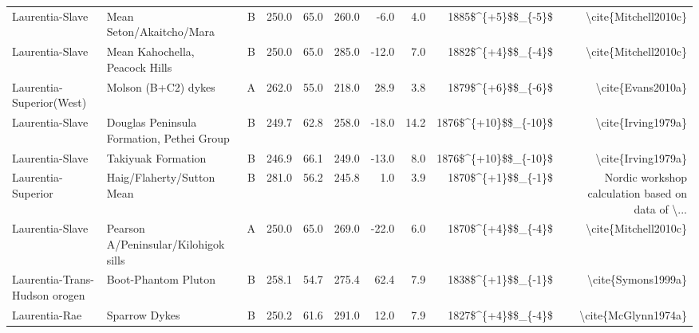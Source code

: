 \begin{longtable}{p{1 in}p{1 in}rrrrrrrr}
               Laurentia-Slave &                         Mean Seton/Akaitcho/Mara &      B &     250.0 &      65.0 & 260.0 &  -6.0 &       4.0 &     1885\$\textasciicircum \{+5\}\$\$\_\{-5\}\$ &                               \textbackslash cite\{Mitchell2010c\} \\
               Laurentia-Slave &                   Mean Kahochella, Peacock Hills &      B &     250.0 &      65.0 & 285.0 & -12.0 &       7.0 &     1882\$\textasciicircum \{+4\}\$\$\_\{-4\}\$ &                               \textbackslash cite\{Mitchell2010c\} \\
      Laurentia-Superior(West) &                              Molson (B+C2) dykes &      A &     262.0 &      55.0 & 218.0 &  28.9 &       3.8 &     1879\$\textasciicircum \{+6\}\$\$\_\{-6\}\$ &                                  \textbackslash cite\{Evans2010a\} \\
               Laurentia-Slave &        Douglas Peninsula Formation, Pethei Group &      B &     249.7 &      62.8 & 258.0 & -18.0 &      14.2 &   1876\$\textasciicircum \{+10\}\$\$\_\{-10\}\$ &                                 \textbackslash cite\{Irving1979a\} \\
               Laurentia-Slave &                               Takiyuak Formation &      B &     246.9 &      66.1 & 249.0 & -13.0 &       8.0 &   1876\$\textasciicircum \{+10\}\$\$\_\{-10\}\$ &                                 \textbackslash cite\{Irving1979a\} \\
            Laurentia-Superior &                       Haig/Flaherty/Sutton Mean  &      B &     281.0 &      56.2 & 245.8 &   1.0 &       3.9 &     1870\$\textasciicircum \{+1\}\$\$\_\{-1\}\$ &  Nordic workshop calculation based on data of \textbackslash ... \\
               Laurentia-Slave &             Pearson A/Peninsular/Kilohigok sills &      A &     250.0 &      65.0 & 269.0 & -22.0 &       6.0 &     1870\$\textasciicircum \{+4\}\$\$\_\{-4\}\$ &                               \textbackslash cite\{Mitchell2010c\} \\
 Laurentia-Trans-Hudson orogen &                              Boot-Phantom Pluton &      B &     258.1 &      54.7 & 275.4 &  62.4 &       7.9 &     1838\$\textasciicircum \{+1\}\$\$\_\{-1\}\$ &                                 \textbackslash cite\{Symons1999a\} \\
                 Laurentia-Rae &                                    Sparrow Dykes &      B &     250.2 &      61.6 & 291.0 &  12.0 &       7.9 &     1827\$\textasciicircum \{+4\}\$\$\_\{-4\}\$ &                                \textbackslash cite\{McGlynn1974a\} \\

\end{longtable}

